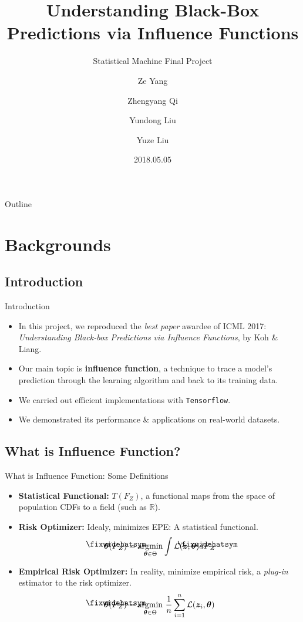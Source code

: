 \documentclass[blue]{beamer}
\title{Understanding Black-Box Predictions via Influence Functions}
\subtitle{Statistical Machine Final Project}
\author{Ze Yang \and Zhengyang Qi \and Yundong Liu \and Yuze Liu}
\institute[Carnegie Mellon University] %
{Carnegie Mellon University}
\date{2018.05.05}
\newcommand\lowerwidehatsym{%
  \text{\smash{\raisebox{-1.3ex}{%
    $\fixwidehatsym$}}}}
\newcommand\fixwidehat[1]{%
  \mathchoice
    {\accentset{\displaystyle\lowerwidehatsym}{#1}}
    {\accentset{\textstyle\lowerwidehatsym}{#1}}
    {\accentset{\scriptstyle\lowerwidehatsym}{#1}}
    {\accentset{\scriptscriptstyle\lowerwidehatsym}{#1}}
}
\begin{document}
\begin{frame}
  \titlepage
\end{frame}

\begin{frame}{Outline}
  \tableofcontents
\end{frame}

\section{Backgrounds}

\subsection{Introduction}

\begin{frame}{Introduction}{}
    \begin{itemize}
        \item  In this project, we reproduced the \emph{best paper} awardee of ICML 2017: \textit{Understanding Black-box Predictions via Influence Functions}, by Koh \& Liang.
        \item Our main topic is \textbf{influence function}, a technique to trace a model’s prediction through the learning algorithm and back to its training data.
        \item  We carried out efficient implementations with \texttt{Tensorflow}.
        \item We demonstrated its performance \& applications on real-world datasets.
        
    \end{itemize}
\end{frame}

\subsection{What is Influence Function?}

\begin{frame}{What is Influence Function: Some Definitions}{}
  \begin{itemize}
  \item \textbf{Statistical Functional:} $T(F_Z)$, a functional maps from the space of population CDFs to a field (such as $\mathbb{R}$). 
  \item \textbf{Risk Optimizer:} Idealy, minimizes EPE: A statistical functional.
  $$
  \bm{\theta}(\fixwidehat{F}_Z)=\underset{\bm{\theta} \in \Theta}{\mathrm{argmin}}\int\mathcal{L}(\bm{z},\bm{\theta})d\fixwidehat{F}_Z
  $$
  \item \textbf{Empirical Risk Optimizer:} In reality, minimize empirical risk, a \textit{plug-in} estimator to the risk optimizer.
    $$
  \bm{\theta}(\fixwidehat{F}_Z)=\underset{\bm{\theta} \in \Theta}{\mathrm{argmin}}~\frac{1}{n}\sum_{i=1}^n\mathcal{L}(\bm{z}_i,\bm{\theta})
  $$
  \end{itemize}
\end{frame}
\end{document}
